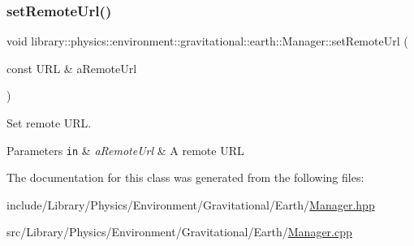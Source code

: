 \subsubsection{\texorpdfstring{set\+Remote\+Url()}{setRemoteUrl()}}
{\footnotesize\ttfamily void library\+::physics\+::environment\+::gravitational\+::earth\+::\+Manager\+::set\+Remote\+Url (\begin{DoxyParamCaption}\item[{const U\+RL \&}]{a\+Remote\+Url }\end{DoxyParamCaption})}



Set remote U\+RL. 


\begin{DoxyParams}[1]{Parameters}
\mbox{\tt in}  & {\em a\+Remote\+Url} & A remote U\+RL \\
\hline
\end{DoxyParams}


The documentation for this class was generated from the following files\+:\begin{DoxyCompactItemize}
\item 
include/\+Library/\+Physics/\+Environment/\+Gravitational/\+Earth/\hyperlink{_environment_2_gravitational_2_earth_2_manager_8hpp}{Manager.\+hpp}\item 
src/\+Library/\+Physics/\+Environment/\+Gravitational/\+Earth/\hyperlink{_environment_2_gravitational_2_earth_2_manager_8cpp}{Manager.\+cpp}\end{DoxyCompactItemize}
